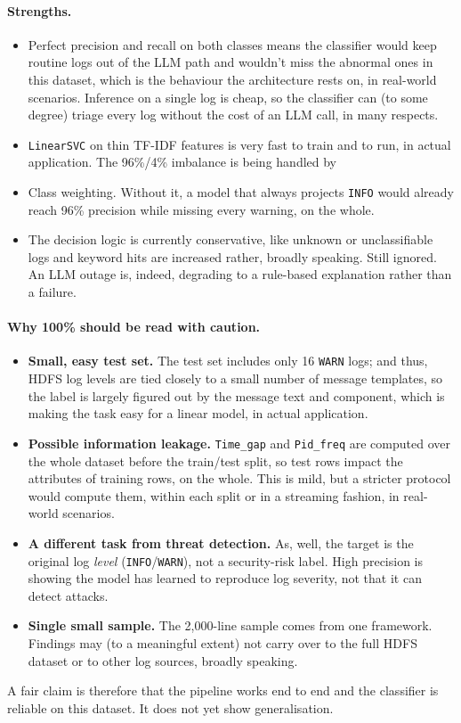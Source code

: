 \documentclass[12pt,a4paper]{report}
\begin{document}
\paragraph{Strengths.}
\begin{itemize}[nosep]
  \item Perfect precision and recall on both classes means the classifier would keep routine logs out of the LLM path and wouldn't miss the abnormal ones in this dataset, which is the behaviour the architecture rests on, in real-world scenarios.
  Inference on a single log is cheap, so the classifier can (to some degree) triage every log without the cost of an LLM call, in many respects. \item \texttt{LinearSVC} on thin TF-IDF features is very fast to train and to run, in actual application.
  The 96\%/4\% imbalance is being handled by \item Class weighting. Without it, a model that always projects \texttt{INFO} would already reach 96\% precision while missing every warning, on the whole.
  \item The decision logic is currently conservative, like unknown or unclassifiable logs and keyword hits are increased rather, broadly speaking. Still ignored. An LLM outage is, indeed, degrading to a rule-based explanation rather than a failure.
\end{itemize}

\paragraph{Why 100\% should be read with caution.}
\begin{itemize}[nosep]
  \item \textbf{Small, easy test set.} The test set includes only 16 \texttt{WARN} logs; and thus, HDFS log levels are tied closely to a small number of message templates, so the label is largely figured out by the message text and component, which is making the task easy for a linear model, in actual application.
  \item \textbf{Possible information leakage.} \texttt{Time\_gap} and \texttt{Pid\_freq} are computed over the whole dataset before the train/test split, so test rows impact the attributes of training rows, on the whole. This is mild, but a stricter protocol would compute them, within each split or in a streaming fashion, in real-world scenarios.
  \item \textbf{A different task from threat detection.} As, well, the target is the original log \emph{level} (\texttt{INFO}/\texttt{WARN}), not a security-risk label. High precision is showing the model has learned to reproduce log severity, not that it can detect attacks.
  \item \textbf{Single small sample.} The 2{,}000-line sample comes from one framework. Findings may (to a meaningful extent) not carry over to the full HDFS dataset or to other log sources, broadly speaking.
\end{itemize}
A fair claim is therefore that the pipeline works end to end and the classifier is reliable on this dataset. It does not yet show generalisation.
\end{document}
